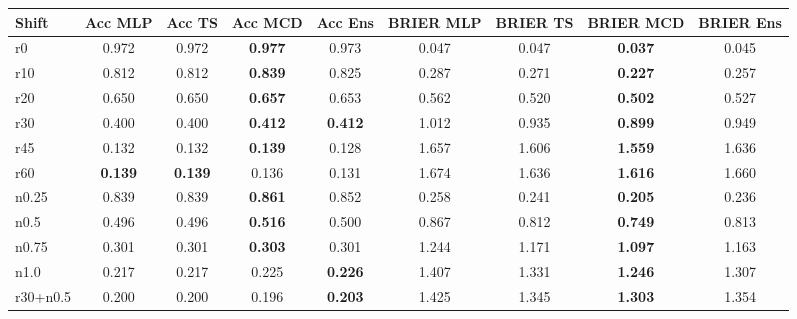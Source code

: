 \begin{tabular}{lcccccccc}
\toprule
Shift & Acc MLP & Acc TS & Acc MCD & Acc Ens & BRIER MLP & BRIER TS & BRIER MCD & BRIER Ens \\
\midrule
r0 & 0.972 & 0.972 & \textbf{0.977} & 0.973 & 0.047 & 0.047 & \textbf{0.037} & 0.045 \\
r10 & 0.812 & 0.812 & \textbf{0.839} & 0.825 & 0.287 & 0.271 & \textbf{0.227} & 0.257 \\
r20 & 0.650 & 0.650 & \textbf{0.657} & 0.653 & 0.562 & 0.520 & \textbf{0.502} & 0.527 \\
r30 & 0.400 & 0.400 & \textbf{0.412} & \textbf{0.412} & 1.012 & 0.935 & \textbf{0.899} & 0.949 \\
r45 & 0.132 & 0.132 & \textbf{0.139} & 0.128 & 1.657 & 1.606 & \textbf{1.559} & 1.636 \\
r60 & \textbf{0.139} & \textbf{0.139} & 0.136 & 0.131 & 1.674 & 1.636 & \textbf{1.616} & 1.660 \\
n0.25 & 0.839 & 0.839 & \textbf{0.861} & 0.852 & 0.258 & 0.241 & \textbf{0.205} & 0.236 \\
n0.5 & 0.496 & 0.496 & \textbf{0.516} & 0.500 & 0.867 & 0.812 & \textbf{0.749} & 0.813 \\
n0.75 & 0.301 & 0.301 & \textbf{0.303} & 0.301 & 1.244 & 1.171 & \textbf{1.097} & 1.163 \\
n1.0 & 0.217 & 0.217 & 0.225 & \textbf{0.226} & 1.407 & 1.331 & \textbf{1.246} & 1.307 \\
r30+n0.5 & 0.200 & 0.200 & 0.196 & \textbf{0.203} & 1.425 & 1.345 & \textbf{1.303} & 1.354 \\
\bottomrule
\end{tabular}